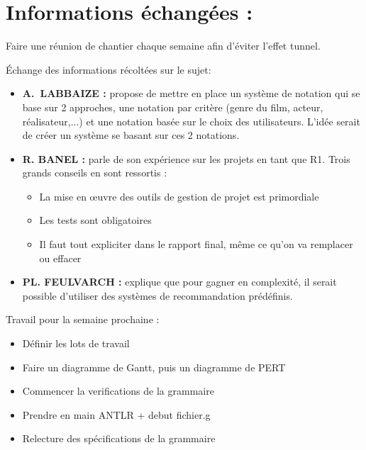 \documentclass[11pt]{meetingmins}
\begin{document}
    \section{Informations échangées :}
    \begin{hiddenitems}
    
    \item Faire une réunion de chantier chaque semaine afin d'éviter l'effet tunnel.
    
    \item
    Échange des informations récoltées sur le sujet:
    \begin{itemize}
        \item \textbf{A.~LABBAIZE : }propose de mettre en place un système de notation qui se base sur 2 approches, une notation par critère (genre du film, acteur, réalisateur,...) et une notation basée sur le choix des utilisateurs. L'idée serait de créer un système se basant sur ces 2 notations.
        
        
    
        \item \textbf{R. BANEL : }parle de son expérience sur les projets en tant que R1. Trois grands conseils en sont ressortis :
        \begin{itemize}
            \item La mise en œuvre des outils de gestion de projet est primordiale
            \item Les tests sont obligatoires
            \item Il faut tout expliciter dans le rapport final, même ce qu'on va remplacer ou effacer
        \end{itemize}
        
        
        \item \textbf{PL. FEULVARCH : }explique que pour gagner en complexité, il serait possible d'utiliser des systèmes de recommandation prédéfinis.
        
    \end{itemize}
    
    
    \item Travail pour la semaine prochaine : 
    \begin{itemize}
        \item Définir les lots de travail 
        \item Faire un diagramme de Gantt, puis un diagramme de PERT
        \item Commencer la verifications de la grammaire
        \item Prendre en main ANTLR + debut fichier.g
        \item Relecture des spécifications de la grammaire
    \end{itemize}
    
    
    \end{hiddenitems}
\end{document}
